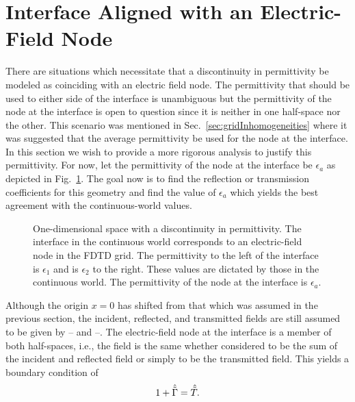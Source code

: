 \section{Interface Aligned with an Electric-Field Node}

There are situations which necessitate that a discontinuity in
permittivity be modeled as coinciding with an electric field node.
The permittivity that should be used to either side of the interface
is unambiguous but the permittivity of the node at the interface is
open to question since it is neither in one half-space nor the other.
This scenario was mentioned in Sec.\ \ref{sec:gridInhomogeneities}
where it was suggested that the average permittivity be used for the
node at the interface.  In this section we wish to provide a more
rigorous analysis to justify this permittivity.  For now, let the
permittivity of the node at the interface be $\epsilon_a$ as depicted
in Fig.\ \ref{fig:averageGeom}.  The goal now is to find the reflection or
transmission coefficients for this geometry and find the value of
$\epsilon_a$ which yields the best agreement with the continuous-world
values.

\begin{figure}
  \begin{center}
  \end{center}
  \caption{One-dimensional space with a discontinuity in
  permittivity.  The interface in the continuous world corresponds to
  an electric-field node in the FDTD grid.  The permittivity to the
  left of the interface is $\epsilon_1$ and is $\epsilon_2$ to the
  right.  These values are dictated by those in the continuous world.
  The permittivity of the node at the interface is $\epsilon_a$.}
  \label{fig:averageGeom}
\end{figure}

Although the origin $x=0$ has shifted from that which was assumed in
the previous section, the incident, reflected, and transmitted fields
are still assumed to be given by -- and 
--.  The electric-field node at the
interface is a member of both half-spaces, i.e., the field is the same
whether considered to be the sum of the incident and reflected field
or simply to be the transmitted field.  This yields a boundary
condition of
\begin{equation}
  1 + \hat{\tilde{\Gamma}} = \hat{\tilde{T}}.
  \label{eq:elecContinuity}
\end{equation}

